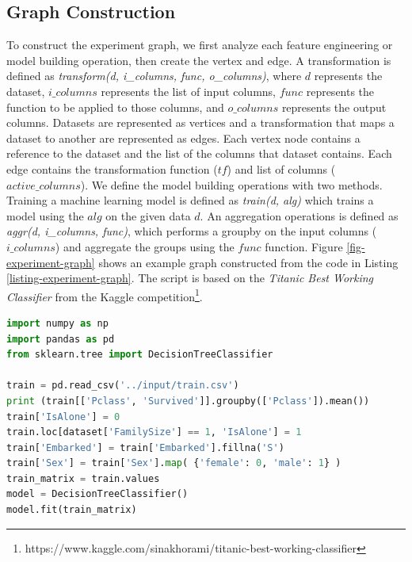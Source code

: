 \subsection{Graph Construction}
To construct the experiment graph, we first analyze each feature engineering or model building operation, then create the vertex and edge.
A transformation is defined as \textit{transform(d, i\_columns, func, o\_columns)}, where $d$ represents the dataset, $i\_columns$ represents the list of input columns, $func$ represents the function to be applied to those columns, and $o\_columns$ represents the output columns.
Datasets are represented as vertices and a transformation that maps a dataset to another are represented as edges.
Each vertex node contains a reference to the dataset and the list of the columns that dataset contains.
Each edge contains the transformation function ($tf$) and list of columns ($active\_columns$).
We define the model building operations with two methods.
Training a machine learning model is defined as \textit{train(d, alg)} which trains a model using the $alg$ on the given data $d$.
An aggregation operations is defined as \textit{aggr(d, i\_columns, func)}, which performs a groupby on the input columns ($i\_columns$) and aggregate the groups using the $func$ function.
Figure \ref{fig-experiment-graph} shows an example graph constructed from the code in Listing \ref{listing-experiment-graph}.
The script is based on the \textit{Titanic Best Working Classifier} from the Kaggle competition\footnote{https://www.kaggle.com/sinakhorami/titanic-best-working-classifier}.

\begin{lstlisting}[language=Python, caption=Example script,captionpos=b,label = {listing-experiment-graph}]
import numpy as np
import pandas as pd
from sklearn.tree import DecisionTreeClassifier

train = pd.read_csv('../input/train.csv')
print (train[['Pclass', 'Survived']].groupby(['Pclass']).mean())
train['IsAlone'] = 0
train.loc[dataset['FamilySize'] == 1, 'IsAlone'] = 1
train['Embarked'] = train['Embarked'].fillna('S') 
train['Sex'] = train['Sex'].map( {'female': 0, 'male': 1} )
train_matrix = train.values
model = DecisionTreeClassifier()
model.fit(train_matrix)
\end{lstlisting}

